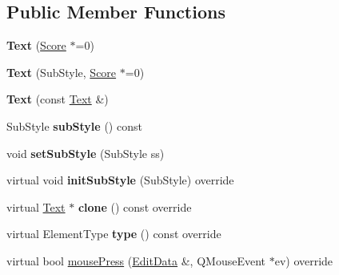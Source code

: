 \subsection*{Public Member Functions}
\begin{DoxyCompactItemize}
\item 
\mbox{\label{class_ms_1_1_text_aa44770ec0bb54123bdafbda8489e812e}} 
{\bfseries Text} (\hyperlink{class_ms_1_1_score}{Score} $\ast$=0)
\item 
\mbox{\label{class_ms_1_1_text_ac76cdbf17f17eca0fd02f562930acbea}} 
{\bfseries Text} (Sub\+Style, \hyperlink{class_ms_1_1_score}{Score} $\ast$=0)
\item 
\mbox{\label{class_ms_1_1_text_abe2bcea246a5f70a7993f5895b47699d}} 
{\bfseries Text} (const \hyperlink{class_ms_1_1_text}{Text} \&)
\item 
\mbox{\label{class_ms_1_1_text_af0c889ff590f36d64e17a6c82dc7d1db}} 
Sub\+Style {\bfseries sub\+Style} () const
\item 
\mbox{\label{class_ms_1_1_text_a7c3dd8154183929fad41096ab1bf7cac}} 
void {\bfseries set\+Sub\+Style} (Sub\+Style ss)
\item 
\mbox{\label{class_ms_1_1_text_ab0c388f18d3e7ee500dfe3ef49736880}} 
virtual void {\bfseries init\+Sub\+Style} (Sub\+Style) override
\item 
\mbox{\label{class_ms_1_1_text_a8efff469222bc989dd1ca16852b0817b}} 
virtual \hyperlink{class_ms_1_1_text}{Text} $\ast$ {\bfseries clone} () const override
\item 
\mbox{\label{class_ms_1_1_text_a7b2621faca7ea6002c87df919eba2828}} 
virtual Element\+Type {\bfseries type} () const override
\item 
virtual bool \hyperlink{class_ms_1_1_text_a39d82a468510e394017eb10fb9bc3e63}{mouse\+Press} (\hyperlink{class_ms_1_1_edit_data}{Edit\+Data} \&, Q\+Mouse\+Event $\ast$ev) override
\item 
\mbox{\label{class_ms_1_1_text_a307d56f461b3d24254f01cef014e0061}} 

\end{DoxyCompactItemize}
